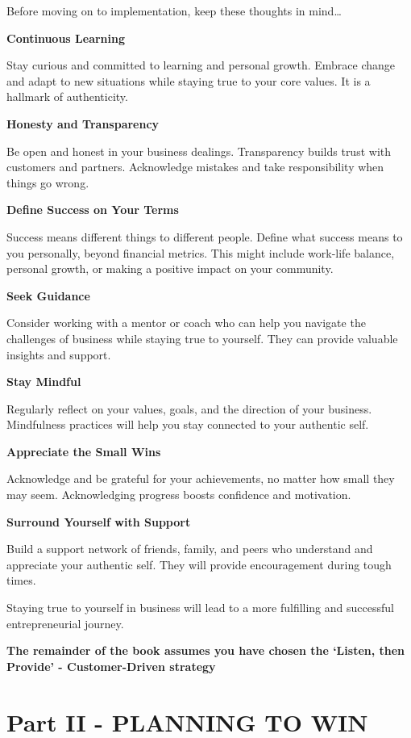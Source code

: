 \documentclass[
]{book}
\begin{document}
Before moving on to implementation, keep these thoughts in mind\ldots{}

\textbf{Continuous Learning}

Stay curious and committed to learning and personal growth. Embrace change and adapt to new situations while staying true to your core values. It is a hallmark of authenticity.

\textbf{Honesty and Transparency}

Be open and honest in your business dealings. Transparency builds trust with customers and partners. Acknowledge mistakes and take responsibility when things go wrong.

\textbf{Define Success on Your Terms}

Success means different things to different people. Define what success means to you personally, beyond financial metrics. This might include work-life balance, personal growth, or making a positive impact on your community.

\textbf{Seek Guidance}

Consider working with a mentor or coach who can help you navigate the challenges of business while staying true to yourself. They can provide valuable insights and support.

\textbf{Stay Mindful}

Regularly reflect on your values, goals, and the direction of your business. Mindfulness practices will help you stay connected to your authentic self.

\textbf{Appreciate the Small Wins}

Acknowledge and be grateful for your achievements, no matter how small they may seem. Acknowledging progress boosts confidence and motivation.

\textbf{Surround Yourself with Support}

Build a support network of friends, family, and peers who understand and appreciate your authentic self. They will provide encouragement during tough times.

Staying true to yourself in business will lead to a more fulfilling and successful entrepreneurial journey.

\textbf{The remainder of the book assumes you have chosen the {`Listen, then Provide'} - Customer-Driven strategy}

\hypertarget{part-part-ii---planning-to-win}{%
\part*{Part II - PLANNING TO WIN}\label{part-part-ii---planning-to-win}}
\end{document}
